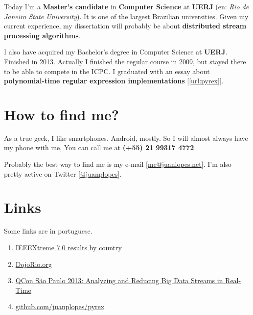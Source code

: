 \documentclass[a4paper,12pt,oneside]{article}
\begin{document}
	Today I'm a \textbf{Master's candidate} in \textbf{Computer Science} at \textbf{UERJ} (en: \emph{Rio de Janeiro State University}). It is one of the largest Brazilian universities. Given my current experience, my dissertation will probably be about \textbf{distributed stream processing algorithms}.

	I also have acquired my Bachelor's degree in Computer Science at \textbf{UERJ}. Finished in 2013. Actually I finished the regular course in 2009, but stayed there to be able to compete in the ICPC. I graduated with an essay about \textbf{polynomial-time regular expression implementations} [\ref{url:pyrex}].

\section*{How to find me?}

	As a true geek, I like smartphones. Android, mostly. So I will almost always have my phone with me, You can call me at \textbf{(+55) 21 99317 4772}.
	
	Probably the best way to find me is my e-mail [\href{mailto:me@juanlopes.net}{me@juanlopes.net}]. I'm also pretty active on Twitter [\href{http://twitter.com/juanplopes}{@juanplopes}].

\section*{Links}

	Some links are in portuguese.

\begin{enumerate}

  \item \label{url:ieeextreme} \href{http://www.ieee.org/membership_services/membership/students/competitions/xtreme/xtreme7_final_rankings-country.pdf}{IEEEXtreme 7.0 results by country}
  \item \label{url:dojorio} \href{http://dojorio.org/}{DojoRio.org}
  \item \label{url:qconsp2013} \href{http://www.infoq.com/br/presentations/analisando-fluxo-dados-tempo-real}{QCon São Paulo 2013: Analyzing and Reducing Big Data Streams in Real-Time}
  \item \label{url:pyrex} \href{http://github.com/juanplopes/pyrex}{github.com/juanplopes/pyrex}
\end{enumerate}
\end{document}
